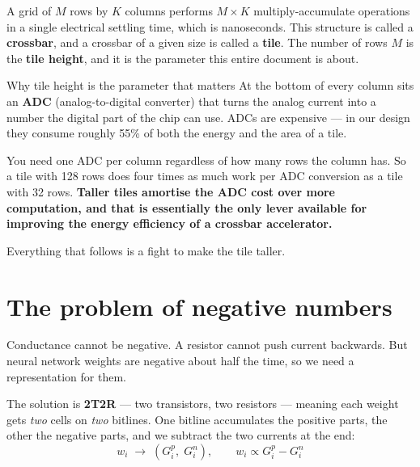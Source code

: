 \documentclass[11pt,a4paper]{report}
\newcommand{\jargon}[1]{\textcolor{acc}{\textbf{#1}}}
\begin{document}
A grid of $M$ rows by $K$ columns performs $M\times K$ multiply-accumulate
operations in a single electrical settling time, which is nanoseconds. This
structure is called a \jargon{crossbar}, and a crossbar of a given size is
called a \jargon{tile}. The number of rows $M$ is the \jargon{tile height},
and it is the parameter this entire document is about.

\begin{keybox}{Why tile height is the parameter that matters}
At the bottom of every column sits an \jargon{ADC} (analog-to-digital
converter) that turns the analog current into a number the digital part of the
chip can use. ADCs are expensive --- in our design they consume roughly 55\%
of both the energy and the area of a tile.

You need one ADC per column regardless of how many rows the column has. So a
tile with 128 rows does four times as much work per ADC conversion as a tile
with 32 rows. \textbf{Taller tiles amortise the ADC cost over more
computation, and that is essentially the only lever available for improving
the energy efficiency of a crossbar accelerator.}

Everything that follows is a fight to make the tile taller.
\end{keybox}

\section{The problem of negative numbers}

Conductance cannot be negative. A resistor cannot push current backwards. But
neural network weights are negative about half the time, so we need a
representation for them.

The solution is \jargon{2T2R} --- two transistors, two resistors --- meaning
each weight gets \emph{two} cells on \emph{two} bitlines. One bitline
accumulates the positive parts, the other the negative parts, and we subtract
the two currents at the end:
\[
w_i \;\longrightarrow\; (G^p_i,\; G^n_i), \qquad
w_i \propto G^p_i - G^n_i
\]
\end{document}
